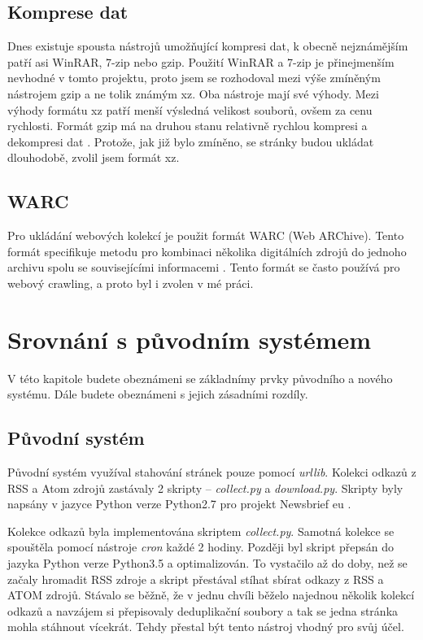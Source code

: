 \subsection{Komprese dat}
Dnes existuje spousta nástrojů umožňující
kompresi dat, k obecně nejznámějším patří asi WinRAR, 7-zip nebo gzip. Použití WinRAR a 7-zip je přinejmenším nevhodné v tomto projektu,
proto jsem se rozhodoval mezi výše zmíněným nástrojem gzip a ne tolik známým xz. Oba nástroje mají své výhody.
Mezi výhody formátu xz patří menší výsledná velikost souborů, ovšem za cenu rychlosti. Formát gzip má na druhou stanu
relativně rychlou kompresi a dekompresi dat \cite{GZIP_VS_XZ}. Protože, jak již bylo zmíněno,
se stránky budou ukládat dlouhodobě, zvolil jsem formát xz.

\subsection{WARC}
\label{warc_format}
Pro ukládání webových kolekcí je použit formát WARC (Web ARChive). Tento formát specifikuje metodu pro kombinaci
několika digitálních zdrojů do jednoho archivu spolu se souvisejícími informacemi \cite{WARC_FROMAT}. Tento formát se často používá
pro webový crawling, a proto byl i zvolen v mé práci.

\section{Srovnání s původním systémem}
V této kapitole budete obeznámeni se základnímy prvky původního a nového systému. Dále budete
obeznámeni s jejich zásadními rozdíly.

\subsection{Původní systém}
Původní systém využíval stahování stránek pouze pomocí \textit{urllib}. Kolekci odkazů z RSS a Atom zdrojů zastávaly 2
skripty -- \textit{collect.py} a \textit{download.py}. Skripty byly napsány v jazyce Python verze Python2.7 pro projekt
Newsbrief eu \cite{NEWSBRIEF}.

Kolekce odkazů byla implementována skriptem \textit{collect.py}. Samotná kolekce se spouštěla pomocí nástroje \textit{cron} každé
2 hodiny. Později byl skript přepsán do jazyka Python verze Python3.5 a optimalizován. To vystačilo až do doby, než se začaly hromadit
RSS zdroje a skript přestával stíhat sbírat odkazy z RSS a ATOM zdrojů. Stávalo se běžně, že v jednu chvíli běželo najednou několik kolekcí odkazů
a navzájem si přepisovaly deduplikační soubory a tak se jedna stránka mohla stáhnout vícekrát. Tehdy přestal být tento nástroj vhodný
pro svůj účel.

